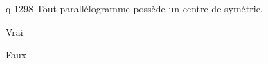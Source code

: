 \begin{truefalse}{q-1298}
Tout parallélogramme possède un centre de symétrie.
\item* Vrai
\item Faux
\end{truefalse}


